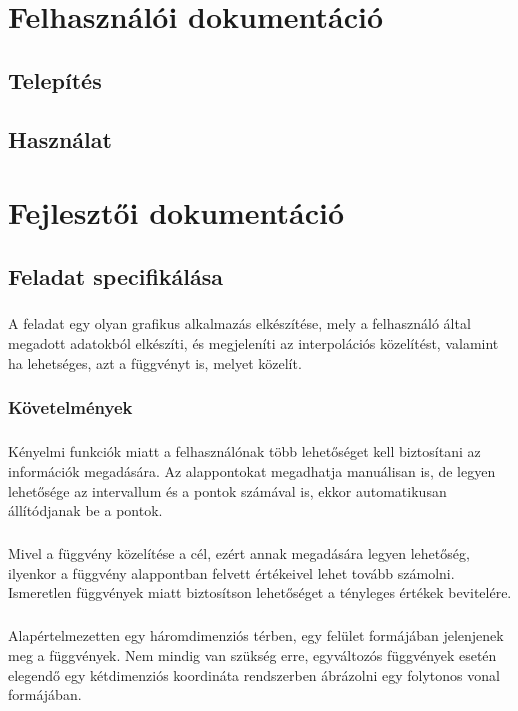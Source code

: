 \documentclass[12pt]{report}
\begin{document}
\chapter{Felhasználói dokumentáció}
\section{Telepítés}
\section{Használat}

\chapter{Fejlesztői dokumentáció}
\section{Feladat specifikálása}
\paragraph{}
A feladat egy olyan grafikus alkalmazás elkészítése, mely a felhasználó által megadott adatokból elkészíti, és megjeleníti az interpolációs közelítést, valamint ha lehetséges, azt a függvényt is, melyet közelít.
\subsection{Követelmények}
\paragraph{}
Kényelmi funkciók miatt a felhasználónak több lehetőséget kell biztosítani az információk megadására. Az alappontokat megadhatja manuálisan is, de legyen lehetősége az intervallum és a pontok számával is, ekkor automatikusan állítódjanak be a pontok.
\paragraph{}
Mivel a függvény közelítése a cél, ezért annak megadására legyen lehetőség, ilyenkor a függvény alappontban felvett értékeivel lehet tovább számolni. Ismeretlen függvények miatt biztosítson lehetőséget a tényleges értékek bevitelére.
\paragraph{}
Alapértelmezetten egy háromdimenziós térben, egy felület formájában jelenjenek meg a függvények. Nem mindig van szükség erre, egyváltozós függvények esetén elegendő egy kétdimenziós koordináta rendszerben ábrázolni egy folytonos vonal formájában.
\end{document}
